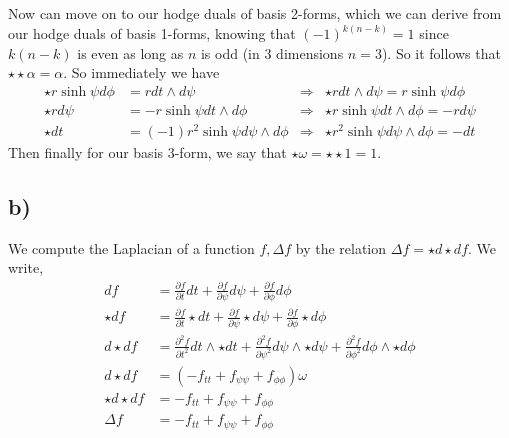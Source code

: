 \documentclass{article}
\theoremstyle{definition}
\begin{document}
Now can move on to our hodge duals of basis 2-forms, which we can derive from our hodge duals of basis 1-forms, knowing 
that $(-1)^{k(n-k)} = 1$ since $k(n-k)$ is even as long as $n$ is odd (in 3 dimensions $n = 3$). So it follows that $\star \star \alpha = \alpha$.
So immediately we have 
\begin{align*}
    \star r \sinh \psi d\phi &= rdt \wedge d\psi &\Longrightarrow& \star r dt \wedge d\psi = r \sinh\psi d\phi \\
    \star rd\psi &= -r\sinh\psi dt \wedge d\phi &\Longrightarrow& \star r \sinh\psi dt \wedge d\phi = -rd\psi \\
    \star dt &= (-1)r^2 \sinh\psi d\psi \wedge d\phi &\Longrightarrow& \star r^2\sinh\psi d\psi \wedge d\phi = -dt
\end{align*}
Then finally for our basis 3-form, we say that $\star \omega = \star \star 1 = 1$.
\subsection*{b)}
We compute the Laplacian of a function $f, \Delta f$ by the relation $\Delta f = \star d \star d f$. We write,
\begin{align*}
    df &= \frac{\partial f}{\partial t} dt + \frac{\partial f}{\partial \psi} d\psi + \frac{\partial f}{\partial \phi} d\phi \\
    \star df &=\frac{\partial f}{\partial t} \star dt + \frac{\partial f}{\partial \psi} \star d\psi + \frac{\partial f}{\partial \phi} \star d\phi \\
    d \star df &=\frac{\partial^2 f}{\partial t^2} dt \wedge \star dt + \frac{\partial^2 f}{\partial \psi^2} d\psi \wedge \star d\psi + \frac{\partial^2 f}{\partial \phi^2}d\phi \wedge \star d\phi \\
    d \star df &=(-f_{tt} + f_{\psi\psi} + f_{\phi\phi})\omega \\
    \star d\star df &= -f_{tt} + f_{\psi\psi} + f_{\phi\phi} \\
    \Delta f &= -f_{tt} + f_{\psi\psi} + f_{\phi\phi}
\end{align*}
\end{document}
